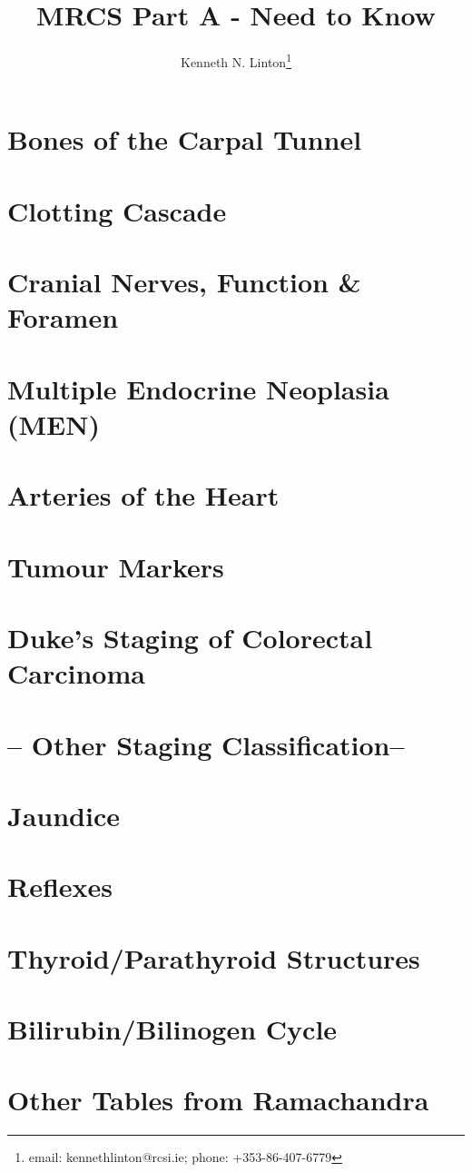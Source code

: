 \documentclass[12pt, a4paper]{article}
\title{MRCS Part A - Need to Know}
\author{Kenneth N. Linton\thanks{email: kennethlinton@rcsi.ie; phone: +353-86-407-6779}}
\begin{document}
\maketitle

\section{Bones of the Carpal Tunnel}
\section{Clotting Cascade}
\section{Cranial Nerves, Function & Foramen}
\section{Multiple Endocrine Neoplasia (MEN)}
\section{Arteries of the Heart}
\section{Tumour Markers}
\section{Duke's Staging of Colorectal Carcinoma}
\section{-- Other Staging Classification--}
\section{Jaundice}
\section{Reflexes}
\section{Thyroid/Parathyroid Structures}
\section{Bilirubin/Bilinogen Cycle}

\section{Other Tables from Ramachandra}

\end{document}
